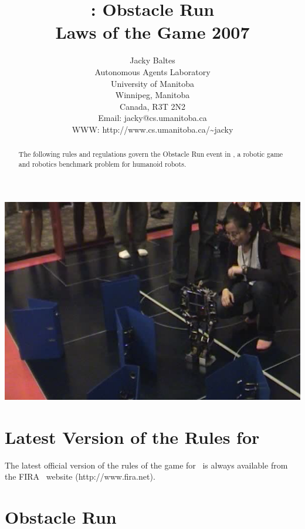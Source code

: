 \documentclass[12pt]{hurocup}
\begin{document}
\title{\HuroCup: Obstacle Run\\
  Laws of the Game 2007}


\author{Jacky Baltes\\
Autonomous Agents Laboratory\\
University of Manitoba\\
Winnipeg, Manitoba\\
Canada, R3T 2N2\\
Email: jacky@cs.umanitoba.ca\\
WWW: http://www.cs.umanitoba.ca/\~{ }jacky
}

\maketitle

\begin{center}
 \includegraphics[width=0.7\linewidth]{Figures/obstacle-run-life}
\end{center}

\begin{abstract}
The following rules and regulations govern the Obstacle Run event in
\HuroCup, a robotic game and robotics benchmark problem for humanoid
robots.
%
\end{abstract}

\section*{Latest Version of the Rules for \HuroCup}
\label{sec:updates}

The latest official version of the rules of the game for \HuroCup\ is
always available from the FIRA \HuroCup\ website (http://www.fira.net).

\newpage

\section{Obstacle Run}
\label{subsec:obstacle-run} 
\end{document}
